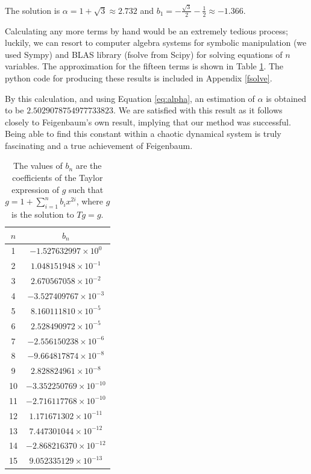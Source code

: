 The solution is $\alpha = 1 + \sqrt{3} \approx 2.732$ and $b_1 = - \frac{\sqrt{3}}{2} - \frac{1}{2} \approx -1.366$.

Calculating any more terms by hand would be an extremely tedious process; luckily, we can resort to computer algebra systems for symbolic manipulation (we used Sympy) and BLAS library (fsolve from Scipy) for solving equations of $n$ variables. 
The approximation for the fifteen terms is shown in Table \ref{tb:b_i table}.
The python code for producing these results is included in Appendix \ref{fsolve}.

By this calculation, and using Equation \eqref{eq:alpha}, an estimation of $\alpha$ is obtained to be $2.5029078754977733823$. We are satisfied with this result as it follows closely to Feigenbaum's own result, implying that our method was successful. Being able to find this constant within a chaotic dynamical system is truly fascinating and a true achievement of Feigenbaum. 

\begin{table}
\centering
\begin{tabular}{|c|c|}
\hline
$n$ & $b_n$ \\
\hline
1 & \( -1.527632997 \times 10^{0} \) \\
2 & \( 1.048151948 \times 10^{-1} \) \\
3 & \( 2.670567058 \times 10^{-2} \) \\
4 & \( -3.527409767 \times 10^{-3} \) \\
5 & \( 8.160111810 \times 10^{-5} \) \\
6 & \( 2.528490972 \times 10^{-5} \) \\
7 & \( -2.556150238 \times 10^{-6} \) \\
8 & \( -9.664817874 \times 10^{-8} \) \\
9 & \( 2.828824961 \times 10^{-8} \) \\
10 & \( -3.352250769 \times 10^{-10} \) \\
11 & \( -2.716117768 \times 10^{-10} \) \\
12 & \( 1.171671302 \times 10^{-11} \) \\
13 & \( 7.447301044 \times 10^{-12} \) \\
14 & \( -2.868216370 \times 10^{-12} \) \\
15 & \( 9.052335129 \times 10^{-13} \) \\
\hline
\end{tabular}
\caption{The values of $b_n$ are the coefficients of the Taylor expression of $g$ such that $g = 1 + \sum_{i=1}^n b_i x^{2i}$, where $g$ is the solution to $Tg = g$.
}
\label{tb:b_i table}
\end{table}


